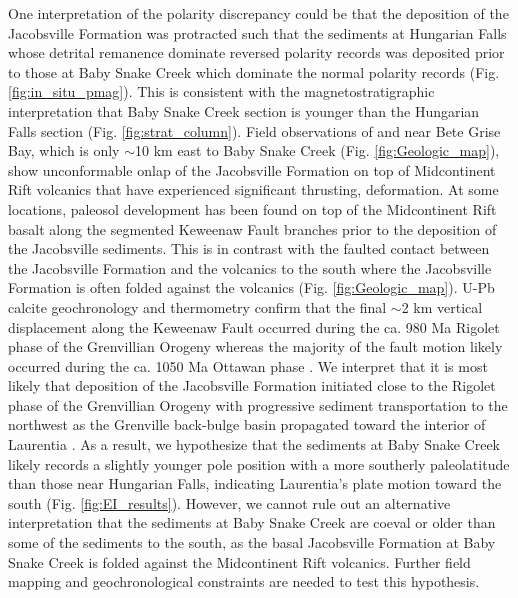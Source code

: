 \documentclass[draft]{agujournal2019}
\begin{document}
One interpretation of the polarity discrepancy could be that the deposition of the Jacobsville Formation was protracted such that the sediments at Hungarian Falls whose detrital remanence dominate reversed polarity records was deposited prior to those at Baby Snake Creek which dominate the normal polarity records (Fig. \ref{fig:in_situ_pmag}). This is consistent with the magnetostratigraphic interpretation that Baby Snake Creek section is younger than the Hungarian Falls section (Fig. \ref{fig:strat_column}). Field observations of  and  near Bete Grise Bay, which is only $\sim$10 km east to Baby Snake Creek (Fig. \ref{fig:Geologic_map}), show unconformable onlap of the Jacobsville Formation on top of Midcontinent Rift volcanics that have experienced significant thrusting, deformation. At some locations, paleosol development has been found on top of the Midcontinent Rift basalt along the segmented Keweenaw Fault branches prior to the deposition of the Jacobsville sediments. This is in contrast with the faulted contact between the Jacobsville Formation and the volcanics to the south where the Jacobsville Formation is often folded against the volcanics (Fig. \ref{fig:Geologic_map}). U-Pb calcite geochronology and thermometry confirm that the final $\sim$2 km vertical displacement along the Keweenaw Fault occurred during the ca. 980 Ma Rigolet phase of the Grenvillian Orogeny whereas the majority of the fault motion likely occurred during the ca. 1050 Ma Ottawan phase \cite{Hodgin2022a}. We interpret that it is most likely that deposition of the Jacobsville Formation initiated close to the Rigolet phase of the Grenvillian Orogeny with progressive sediment transportation to the northwest as the Grenville back-bulge basin propagated toward the interior of Laurentia \cite{Hodgin2022a}. As a result, we hypothesize that the sediments at Baby Snake Creek likely records a slightly younger pole position with a more southerly paleolatitude than those near Hungarian Falls, indicating Laurentia's plate motion toward the south (Fig. \ref{fig:EI_results}). However, we cannot rule out an alternative interpretation that the sediments at Baby Snake Creek are coeval or older than some of the sediments to the south, as the basal Jacobsville Formation at Baby Snake Creek is folded against the Midcontinent Rift volcanics. Further field mapping and geochronological constraints are needed to test this hypothesis. 
\end{document}
